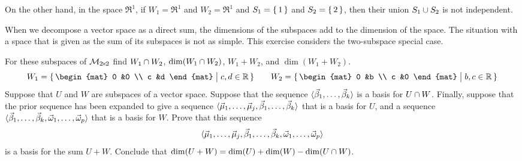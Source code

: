 \begin{exercises}
\begin{answer}
\begin{exparts}
          On the other hand, in the space $\Re^1$, 
          if \( W_1=\Re^1 \) and \( W_2=\Re^1 \) and $S_1=\mbox{$\{\,1\,\}$}$ and
          $S_2=\mbox{$\{\,2\,\}$}$, then their union $S_1\cup S_2$ is not independent.
      \end{exparts}  
     \end{answer}
  \item \label{exer:BasesSumTwoSubs}
    When we decompose a vector space as a direct sum, the dimensions
    of the subspaces add to the dimension of the space.
    The situation with a space that is given as the sum of its subspaces 
    is not as simple.
    This exercise considers the two-subspace special case.
    \begin{exparts}
      \partsitem For these subspaces of \( \mathcal{M}_{2 \! \times \! 2} \) find
        \( W_1\cap W_2 \), \( \dim(W_1\cap W_2) \),
        \( W_1+W_2 \), and \( \dim(W_1+W_2) \).
        \begin{equation*}
          W_1=\set{\begin{mat}
                    0  &0  \\
                    c  &d
                  \end{mat} \suchthat c,d\in\Re  }
          \qquad
         W_2=\set{\begin{mat}
                    0  &b  \\
                    c  &0
                  \end{mat} \suchthat b,c\in\Re  }
       \end{equation*}
     \partsitem Suppose that \( U \) and \( W \) are subspaces 
       of a vector space.
       Suppose that the sequence 
       \( \langle\vec{\beta}_1,\dots,\vec{\beta}_k\rangle \) 
       is a basis for
       \( U\cap W \).
       Finally, suppose that the prior sequence has been expanded to give
       a sequence \( \langle\vec{\mu}_1,\dots,\vec{\mu}_j,
       \vec{\beta}_1,\dots,\vec{\beta}_k\rangle \)
       that is a basis for \( U \), and a sequence
       \( \langle\vec{\beta}_1,\dots,\vec{\beta}_k,
          \vec{\omega}_1,\dots,\vec{\omega}_p\rangle \)
       that is a basis for \( W \). 
       Prove that this sequence
       \begin{equation*}
         \langle\vec{\mu}_1,\dots,\vec{\mu}_j,
              \vec{\beta}_1,\dots,\vec{\beta}_k,
              \vec{\omega}_1,\dots,\vec{\omega}_p\rangle
       \end{equation*}
       is a basis for the sum \( U+W \).
      \partsitem Conclude that 
          $\dim (U+W)=\dim(U)+\dim(W)-\dim(U\cap W)$.

\end{exparts}
\end{exercises}
